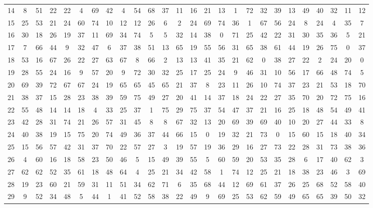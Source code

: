 \begin{table}
\begin{tabular}{c c c c c c c c c c c c c c c c c c c c c c c c c c }
14 & 8 & 51 & 22 & 22 & 4 & 69 & 42 & 4 & 54 & 68 & 37 & 11 & 16 & 21 & 13 & 1 & 72 & 32 & 39 & 13 & 49 & 40 & 32 & 11 & 12 \\
15 & 25 & 53 & 21 & 24 & 60 & 74 & 10 & 12 & 12 & 26 & 6 & 2 & 24 & 69 & 74 & 36 & 1 & 67 & 56 & 24 & 8 & 24 & 4 & 35 & 7 \\
16 & 30 & 18 & 26 & 19 & 37 & 11 & 69 & 34 & 74 & 5 & 5 & 32 & 14 & 38 & 0 & 71 & 25 & 42 & 22 & 31 & 30 & 35 & 36 & 5 & 21 \\
17 & 7 & 66 & 44 & 9 & 32 & 47 & 6 & 37 & 38 & 51 & 13 & 65 & 19 & 55 & 56 & 31 & 65 & 38 & 61 & 44 & 19 & 26 & 75 & 0 & 37 \\
18 & 53 & 16 & 67 & 26 & 22 & 27 & 63 & 67 & 8 & 66 & 2 & 13 & 13 & 41 & 35 & 21 & 62 & 0 & 38 & 27 & 22 & 2 & 24 & 20 & 0 \\
19 & 28 & 55 & 24 & 16 & 9 & 57 & 20 & 9 & 72 & 30 & 32 & 25 & 17 & 25 & 24 & 9 & 46 & 31 & 10 & 56 & 17 & 66 & 48 & 74 & 5 \\
20 & 69 & 39 & 72 & 67 & 67 & 24 & 19 & 65 & 65 & 45 & 65 & 21 & 37 & 8 & 23 & 11 & 26 & 10 & 74 & 37 & 23 & 21 & 53 & 18 & 70 \\
21 & 38 & 37 & 15 & 28 & 23 & 38 & 39 & 59 & 75 & 49 & 27 & 20 & 41 & 14 & 37 & 18 & 24 & 22 & 27 & 35 & 70 & 20 & 72 & 75 & 16 \\
22 & 55 & 48 & 14 & 14 & 18 & 4 & 33 & 25 & 37 & 1 & 75 & 29 & 75 & 37 & 54 & 47 & 37 & 21 & 16 & 25 & 18 & 48 & 54 & 49 & 41 \\
23 & 42 & 28 & 31 & 74 & 21 & 26 & 57 & 31 & 45 & 8 & 8 & 67 & 32 & 13 & 20 & 69 & 39 & 69 & 40 & 10 & 20 & 27 & 44 & 33 & 8 \\
24 & 40 & 38 & 19 & 15 & 75 & 20 & 74 & 49 & 36 & 37 & 44 & 66 & 15 & 0 & 19 & 32 & 21 & 73 & 0 & 15 & 60 & 15 & 18 & 40 & 34 \\
25 & 15 & 56 & 57 & 42 & 31 & 37 & 70 & 22 & 57 & 27 & 3 & 19 & 57 & 19 & 36 & 29 & 16 & 27 & 73 & 22 & 28 & 31 & 73 & 38 & 36 \\
26 & 4 & 60 & 16 & 18 & 58 & 23 & 50 & 46 & 5 & 15 & 49 & 39 & 55 & 5 & 60 & 59 & 20 & 53 & 35 & 28 & 6 & 17 & 40 & 62 & 3 \\
27 & 62 & 62 & 52 & 35 & 61 & 18 & 48 & 64 & 4 & 25 & 21 & 34 & 42 & 58 & 1 & 74 & 12 & 25 & 21 & 18 & 38 & 23 & 46 & 3 & 69 \\
28 & 19 & 23 & 60 & 21 & 59 & 31 & 11 & 51 & 34 & 62 & 71 & 6 & 35 & 68 & 44 & 12 & 69 & 61 & 37 & 26 & 25 & 68 & 52 & 58 & 40 \\
29 & 9 & 52 & 34 & 48 & 5 & 44 & 1 & 41 & 52 & 58 & 38 & 22 & 49 & 9 & 69 & 25 & 53 & 62 & 59 & 49 & 65 & 65 & 39 & 50 & 32 \\

\end{tabular}
\end{table}
